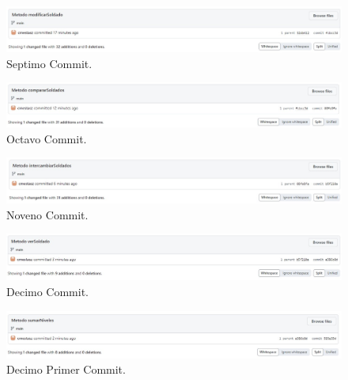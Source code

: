 \documentclass{article}
\begin{document}
\begin{figure}[H]
	\centering
	\includegraphics[width=1\textwidth,keepaspectratio]{img/commit07.jpg}
	\caption{Septimo Commit.}
\end{figure}
\begin{figure}[H]
	\centering
	\includegraphics[width=1\textwidth,keepaspectratio]{img/commit08.jpg}
	\caption{Octavo Commit.}
\end{figure}
\begin{figure}[H]
	\centering
	\includegraphics[width=1\textwidth,keepaspectratio]{img/commit09.jpg}
	\caption{Noveno Commit.}
\end{figure}
\begin{figure}[H]
	\centering
	\includegraphics[width=1\textwidth,keepaspectratio]{img/commit10.jpg}
	\caption{Decimo Commit.}
\end{figure}
\begin{figure}[H]
	\centering
	\includegraphics[width=1\textwidth,keepaspectratio]{img/commit11.jpg}
	\caption{Decimo Primer Commit.}
\end{figure}
\pagebreak
\end{document}

